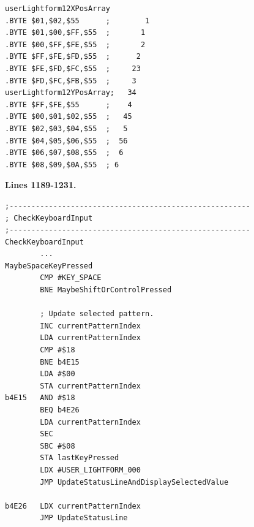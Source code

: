 \begin{minipage}[b]{0.48\linewidth}
\vspace{2cm}
\begin{lrbox}{\mybox}%
\hspace{1cm}
\begin{lstlisting}[basicstyle=\ttfamily\tiny,escapechar=\%]
userLightform12XPosArray
.BYTE $01,$02,$55      ;        1
.BYTE $01,$00,$FF,$55  ;       1 
.BYTE $00,$FF,$FE,$55  ;       2 
.BYTE $FF,$FE,$FD,$55  ;      2  
.BYTE $FE,$FD,$FC,$55  ;     23  
.BYTE $FD,$FC,$FB,$55  ;     3   
userLightform12YPosArray;   34  
.BYTE $FF,$FE,$55      ;    4   
.BYTE $00,$01,$02,$55  ;   45   
.BYTE $02,$03,$04,$55  ;   5    
.BYTE $04,$05,$06,$55  ;  56    
.BYTE $06,$07,$08,$55  ;  6     
.BYTE $08,$09,$0A,$55  ; 6      
\end{lstlisting}
\end{lrbox}%
\scalebox{0.8}{\usebox{\mybox}}

\end{minipage}
%
\clearpage
\textbf{Lines 1189-1231. } 
\begin{lstlisting}[basicstyle=\ttfamily\scriptsize]
;-------------------------------------------------------
; CheckKeyboardInput
;-------------------------------------------------------
CheckKeyboardInput   
        ...
MaybeSpaceKeyPressed   
        CMP #KEY_SPACE
        BNE MaybeShiftOrControlPressed

        ; Update selected pattern.
        INC currentPatternIndex
        LDA currentPatternIndex
        CMP #$18
        BNE b4E15
        LDA #$00
        STA currentPatternIndex
b4E15   AND #$18
        BEQ b4E26
        LDA currentPatternIndex
        SEC 
        SBC #$08
        STA lastKeyPressed
        LDX #USER_LIGHTFORM_000
        JMP UpdateStatusLineAndDisplaySelectedValue

b4E26   LDX currentPatternIndex
        JMP UpdateStatusLine
\end{lstlisting}
\clearpage

